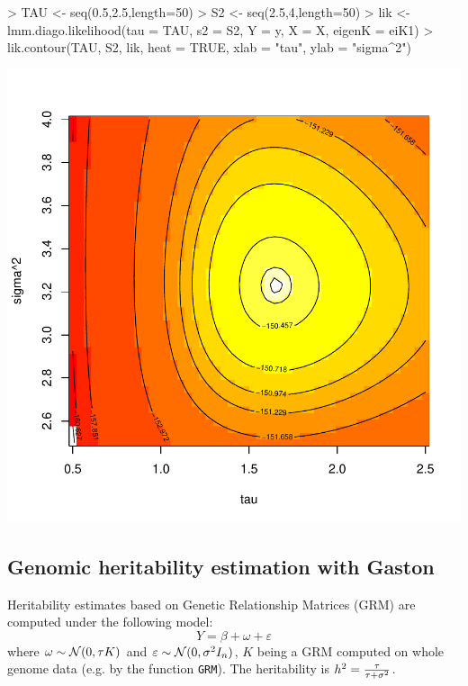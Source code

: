 \documentclass{article}
\let\epsilon\varepsilon
\renewenvironment{Schunk}{\vspace{\topsep}}{\vspace{\topsep}}
\begin{document}
\begin{center}
\begin{Schunk}
\begin{Sinput}
> TAU <- seq(0.5,2.5,length=50)
> S2 <- seq(2.5,4,length=50)
> lik <- lmm.diago.likelihood(tau = TAU, s2 = S2, Y = y, X = X, eigenK = eiK1)
> lik.contour(TAU, S2, lik, heat = TRUE, xlab = "tau", ylab = "sigma^2")
\end{Sinput}
\end{Schunk}
\includegraphics{gaston-047}
\end{center}



\subsection{Genomic heritability estimation with Gaston}

  Heritability estimates based on Genetic Relationship Matrices (GRM)
  are computed under the following model:
  \begin{equation*}
  Y = \beta + \omega + \epsilon
  \end{equation*}
  where $\omega \sim \mathcal{N}(0, \tau K)$ and $\epsilon\sim \N(0, \sigma^2 I_n)$,
  $K$ being a GRM computed on whole genome data (e.g. by the function \verb!GRM!).
  The heritability is $h^2 = {\tau \over \tau + \sigma^2}$.
\end{document}
